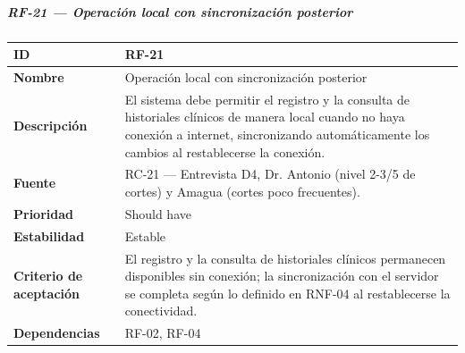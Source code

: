 \documentclass[
]{article}
\newcounter{none} %
\begin{document}
\subparagraph{RF-21 --- Operación local con sincronización
posterior}\label{rf-21-operaciuxf3n-local-con-sincronizaciuxf3n-posterior}

{\def\LTcaptype{none} %
\begin{longtable}[]{@{}
  >{\raggedright\arraybackslash}p{}
  >{\raggedright\arraybackslash}p{}@{}}
\toprule\noalign{}
\begin{minipage}[b]{\linewidth}\raggedright
\textbf{ID}
\end{minipage} & \begin{minipage}[b]{\linewidth}\raggedright
RF-21
\end{minipage} \\
\midrule\noalign{}
\endhead
\bottomrule\noalign{}
\endlastfoot
\textbf{Nombre} & \begin{minipage}[t]{\linewidth}\raggedright
Operación local con sincronización posterior
\end{minipage} \\
\textbf{Descripción} & \begin{minipage}[t]{\linewidth}\raggedright
El sistema debe permitir el registro y la consulta de historiales
clínicos de manera local cuando no haya conexión a internet, sincronizando automáticamente
los cambios al restablecerse la conexión.
\end{minipage} \\
\textbf{Fuente} & \begin{minipage}[t]{\linewidth}\raggedright
RC-21 --- Entrevista D4, Dr. Antonio (nivel 2-3/5 de cortes) y Amagua
(cortes poco frecuentes).
\end{minipage} \\
\textbf{Prioridad} & \begin{minipage}[t]{\linewidth}\raggedright
Should have
\end{minipage} \\
\textbf{Estabilidad} & \begin{minipage}[t]{\linewidth}\raggedright
Estable
\end{minipage} \\
\textbf{Criterio de aceptación} &
\begin{minipage}[t]{\linewidth}\raggedright
El registro y la consulta de historiales clínicos permanecen disponibles
sin conexión; la sincronización con el servidor se completa según lo definido en
RNF-04 al restablecerse la conectividad.
\end{minipage} \\
\textbf{Dependencias} & \begin{minipage}[t]{\linewidth}\raggedright
RF-02, RF-04
\end{minipage} \\
\end{longtable}
}
\end{document}
